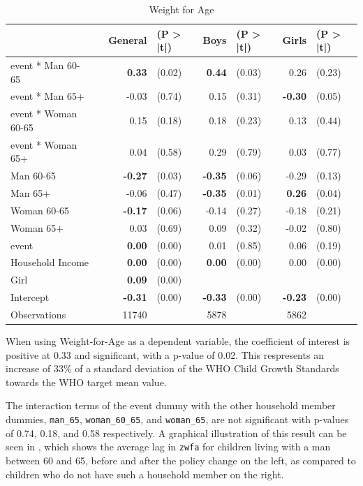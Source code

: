 \documentclass[a4paper,british]{article}\usepackage[]{graphicx}\usepackage[]{color}
\providecommand{\tabularnewline}{\\}
\newcommand{\code}[1]{\texttt{#1}}
\begin{document}
\begin{table}[H]
\caption{Weight for Age}

\begin{centering}
\label{tab:WAZ-full}
\par\end{centering}
\centering{}%
\begin{tabular}{l|lrl|rl|rl}
\hline 
 &
 &
General &
(P > |t|) &
Boys &
(P > |t|) &
Girls &
(P > |t|)\tabularnewline
\hline 
event {*} Man 60-65 &
 &
\textbf{0.33} &
(0.02) &
\textbf{0.44} &
(0.03) &
0.26 &
(0.23)\tabularnewline
event {*} Man 65+ &
 &
-0.03 &
(0.74) &
0.15 &
(0.31) &
\textbf{-0.30} &
(0.05)\tabularnewline
event {*} Woman 60-65 &
 &
0.15 &
(0.18) &
0.18 &
(0.23) &
0.13 &
(0.44)\tabularnewline
event {*} Woman 65+ &
 &
0.04 &
(0.58) &
0.29 &
(0.79) &
0.03 &
(0.77)\tabularnewline
Man 60-65 &
 &
\textbf{-0.27} &
(0.03) &
\textbf{-0.35} &
(0.06) &
-0.29 &
(0.13)\tabularnewline
Man 65+ &
 &
-0.06 &
(0.47) &
\textbf{-0.35} &
(0.01) &
\textbf{0.26} &
(0.04)\tabularnewline
Woman 60-65 &
 &
\textbf{-0.17} &
(0.06) &
-0.14 &
(0.27) &
-0.18 &
(0.21)\tabularnewline
Woman 65+ &
 &
0.03 &
(0.69) &
0.09 &
(0.32) &
-0.02 &
(0.80)\tabularnewline
event &
 &
\textbf{0.00} &
(0.00) &
0.01 &
(0.85) &
0.06 &
(0.19)\tabularnewline
Household Income &
 &
\textbf{0.00} &
(0.00) &
\textbf{0.00} &
(0.00) &
0.00 &
(0.00)\tabularnewline
Girl &
 &
\textbf{0.09} &
(0.00) &
 &
 &
 &
\tabularnewline
Intercept &
 &
\textbf{-0.31} &
(0.00) &
\textbf{-0.33} &
(0.00) &
\textbf{-0.23} &
(0.00)\tabularnewline
\hline 
Observations &
 &
11740 &
 &
5878 &
 &
5862 &
\tabularnewline
\end{tabular}
\end{table}

When using Weight-for-Age as a dependent variable, the coefficient
of interest is positive at 0.33 and significant, with a p-value of
0.02. This respresents an increase of 33\% of a standard deviation
of the WHO Child Growth Standards towards the WHO target mean value.

The interaction terms of the event dummy with the other household
member dummies, \code{man\_65}, \code{woman\_60\_65}, and \code{woman\_65},
are not significant with p-values of 0.74, 0.18, and 0.58 respectively.
A graphical illustration of this result can be seen in ,
which shows the average lag in \code{zwfa} for children living with
a man between 60 and 65, before and after the policy change on the
left, as compared to children who do not have such a household member
on the right. 
\end{document}
